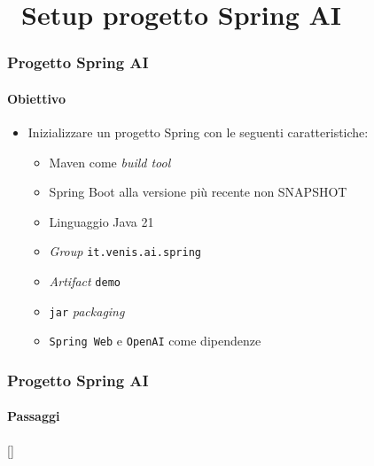 \section{\faWrench\ Setup progetto Spring AI} %
\label{sec:spring-ai-project-setup}
%
\begin{frame}[t,fragile] \frametitle{Progetto Spring AI}
    \framesubtitle{Obiettivo}
    \begin{itemize}[leftmargin=10pt,align=right]
        \item[\alert{\faHandORight}] Inizializzare un progetto Spring con le seguenti caratteristiche:     
        \begin{itemize}[leftmargin=10pt,align=right]
            \item[\alert{\faHandORight}] \alert{Maven} come \textit{build tool}
            \item[\alert{\faHandORight}] Spring Boot alla versione più recente \alert{non SNAPSHOT}
            \item[\alert{\faHandORight}] Linguaggio \alert{Java 21}
            \item[\alert{\faHandORight}] \textit{Group} \alert{\texttt{it.venis.ai.spring}}
            \item[\alert{\faHandORight}] \textit{Artifact} \alert{\texttt{demo}}
            \item[\alert{\faHandORight}] \alert{\texttt{jar}} \textit{packaging}
            \item[\alert{\faHandORight}] \alert{\texttt{Spring Web}} e \alert{\texttt{OpenAI}} come dipendenze
        \end{itemize}
    \end{itemize}
\end{frame}
%
\begin{frame}[t,fragile] \frametitle{Progetto Spring AI}
    \framesubtitle{Passaggi}
    []
    \tableofcontents[sections={2}]
\end{frame}
%
